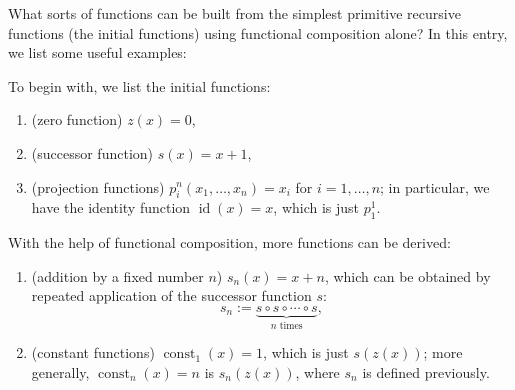 \documentclass[12pt]{article}
\begin{document}
What sorts of functions can be built from the simplest primitive recursive functions (the initial functions) using functional composition alone?  In this entry, we list some useful examples:

To begin with, we list the initial functions:
\begin{enumerate}
\item (zero function) $z(x)=0$, 
\item (successor function) $s(x)=x+1$, 
\item (projection functions) $p_i^n(x_1,\ldots,x_n)=x_i$ for $i=1,\ldots,n$; in particular, we have the identity function $\operatorname{id}(x)=x$, which is just $p_1^1$.
\end{enumerate}

With the help of functional composition, more functions can be derived:
\begin{enumerate}
\item (addition by a fixed number $n$) $s_n(x)=x+n$, which can be obtained by repeated application of the successor function $s$: $$s_n := \underbrace{s\circ s \circ \cdots \circ s}_{n\mbox{ times}},$$
\item (constant functions) $\operatorname{const}_1(x)=1$, which is just $s(z(x))$; more generally, $\operatorname{const}_n(x)=n$ is $s_n(z(x))$, where $s_n$ is defined previously.
\end{enumerate}
\end{document}
